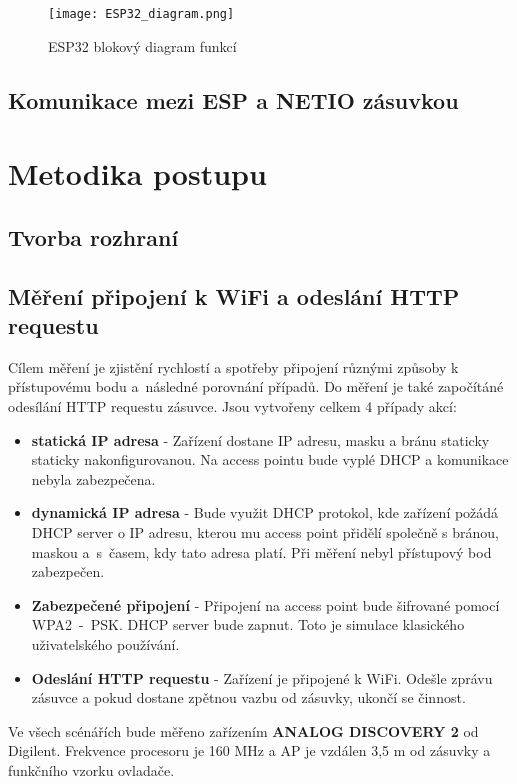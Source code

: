 \documentclass[a4paper, 12pt]{report}
\begin{document}
				\begin{figure}[h]
					\centering
					\texttt{[image: ESP32\_diagram.png]}
					\caption{ESP32 blokový diagram funkcí}
					\label{ESP32_diagram}
				\end{figure}



		\section{Komunikace mezi ESP a NETIO zásuvkou}

	\chapter{Metodika postupu}
		\section{Tvorba rozhraní}
		\section{Měření připojení k WiFi a odeslání HTTP requestu}
				Cílem měření je zjistění rychlostí a spotřeby připojení různými způsoby k přístupovému bodu a~následné porovnání případů. Do měření je také započítáné odesílání HTTP requestu zásuvce. Jsou vytvořeny celkem 4 případy akcí:
				\begin{itemize}
					\item {\bf statická IP adresa} - 	Zařízení dostane IP adresu, masku a bránu staticky staticky nakonfigurovanou. Na access pointu bude vyplé DHCP a komunikace nebyla zabezpečena.
					\item {\bf dynamická IP adresa} - Bude využit DHCP protokol, kde zařízení požádá DHCP server o IP adresu, kterou mu access point přidělí společně s bránou, maskou a~s~časem, kdy tato adresa platí. Při měření nebyl přístupový bod zabezpečen.
					\item {\bf Zabezpečené připojení} - Připojení na access point bude šifrované pomocí WPA2~-~PSK. DHCP server bude zapnut. Toto je simulace klasického uživatelského používání.
					\item {\bf Odeslání HTTP requestu} - Zařízení je připojené k WiFi. Odešle zprávu zásuvce a pokud dostane zpětnou vazbu od zásuvky, ukončí se činnost.
				\end{itemize}
				Ve všech scénářích bude měřeno zařízením {\bf ANALOG DISCOVERY 2} od Digilent. Frekvence procesoru je 160 \si{MHz} a AP je vzdálen 3,5 \si{m} od zásuvky a funkčního vzorku ovladače.
\end{document}
